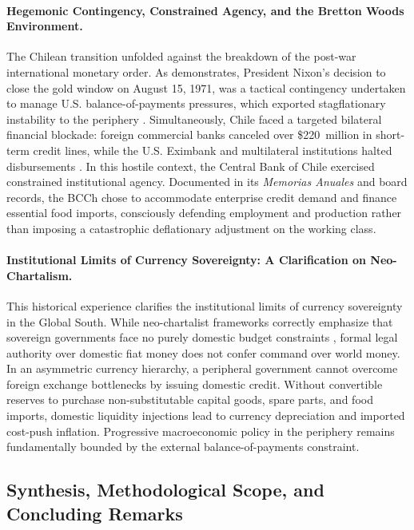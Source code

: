 \paragraph{Hegemonic Contingency, Constrained Agency, and the Bretton Woods Environment.}
The Chilean transition unfolded against the breakdown of the post-war international monetary order. As \citet{Zoeller2019} demonstrates, President Nixon's decision to close the gold window on August 15, 1971, was a tactical contingency undertaken to manage U.S. balance-of-payments pressures, which exported stagflationary instability to the periphery \citep{Vernengo2021}. Simultaneously, Chile faced a targeted bilateral financial blockade: foreign commercial banks canceled over \$220~million in short-term credit lines, while the U.S. Eximbank and multilateral institutions halted disbursements \citep{DeVylder1976,PetrasMorley1975}. In this hostile context, the Central Bank of Chile exercised constrained institutional agency. Documented in its \textit{Memorias Anuales} and board records, the BCCh chose to accommodate enterprise credit demand and finance essential food imports, consciously defending employment and production rather than imposing a catastrophic deflationary adjustment on the working class.

\paragraph{Institutional Limits of Currency Sovereignty: A Clarification on Neo-Chartalism.}
This historical experience clarifies the institutional limits of currency sovereignty in the Global South. While neo-chartalist frameworks correctly emphasize that sovereign governments face no purely domestic budget constraints \citep{AlamiEtAl2022}, formal legal authority over domestic fiat money does not confer command over world money. In an asymmetric currency hierarchy, a peripheral government cannot overcome foreign exchange bottlenecks by issuing domestic credit. Without convertible reserves to purchase non-substitutable capital goods, spare parts, and food imports, domestic liquidity injections lead to currency depreciation and imported cost-push inflation. Progressive macroeconomic policy in the periphery remains fundamentally bounded by the external balance-of-payments constraint.

\subsection{Synthesis, Methodological Scope, and Concluding Remarks}
\label{sec:synthesis_horizons}

